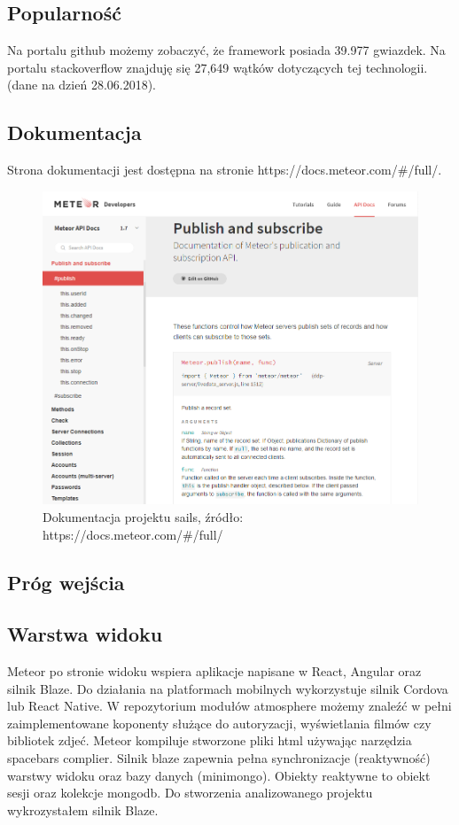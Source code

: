 \documentclass[12pt]{report}
\begin{document}
    \subsection{Popularność}
      Na portalu github możemy zobaczyć, że framework posiada 39.977 gwiazdek.
      Na portalu stackoverflow znajduję się 27,649 wątków dotyczących tej technologii.
      (dane na dzień 28.06.2018).

    \subsection{Dokumentacja}
      Strona dokumentacji jest dostępna na stronie https://docs.meteor.com/\#/full/.
      \begin{figure}[!hb]
        \centering
        \includegraphics[width=\textwidth,height=\textheight,keepaspectratio]{doc_meteor.png} 
        \caption{Dokumentacja projektu sails, źródło: https://docs.meteor.com/\#/full/}
      \end{figure}

    \subsection{Próg wejścia}
    \subsection{Warstwa widoku}
      Meteor po stronie widoku wspiera aplikacje napisane w React, Angular oraz silnik Blaze.
      Do działania na platformach mobilnych wykorzystuje silnik Cordova lub React Native.
      W repozytorium modułów atmosphere możemy znaleźć w pełni zaimplementowane koponenty służące do autoryzacji, wyświetlania filmów czy bibliotek zdjeć.
      Meteor kompiluje stworzone pliki html używając narzędzia spacebars complier.
      Silnik blaze zapewnia pełna synchronizacje (reaktywność) warstwy widoku oraz bazy danych (minimongo).
      Obiekty reaktywne to obiekt sesji oraz kolekcje mongodb.
      Do stworzenia analizowanego projektu wykrozystałem silnik Blaze.
\end{document}

